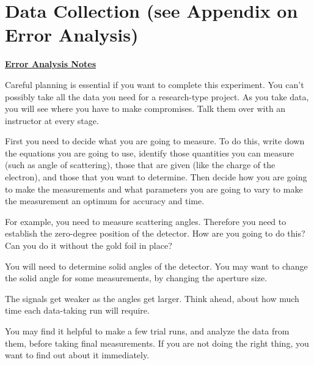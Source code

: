\documentclass{../lab}
\begin{document}
\section{Data Collection (see Appendix on Error Analysis)}

\href{http://experimentationlab.berkeley.edu/EAX}{\textbf{Error Analysis Notes}}

Careful planning is essential if you want to complete this experiment. You can't possibly take all the data you need for a research-type project. As you take data, you will see where you have to make compromises. Talk them over with an instructor at every stage.

First you need to decide what you are going to measure. To do this, write down the equations you are going to use, identify those quantities you can measure (such as angle of scattering), those that are given (like the charge of the electron), and those that you want to determine. Then decide how you are going to make the measurements and what parameters you are going to vary to make the measurement an optimum for accuracy and time.

For example, you need to measure scattering angles. Therefore you need to establish the zero-degree position of the detector. How are you going to do this? Can you do it without the gold foil in place?



You will need to determine solid angles of the detector. You may want to change the solid angle for some measurements, by changing the aperture size.

The signals get weaker as the angles get larger. Think ahead, about how much time each data-taking run will require.

You may find it helpful to make a few trial runs, and analyze the data from them, before taking final measurements. If you are not doing the right thing, you want to find out about it immediately.

\end{document}
